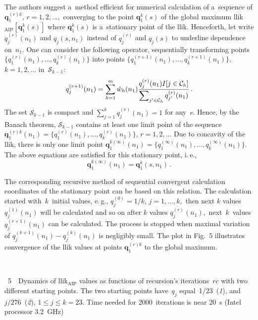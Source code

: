 \begin{multicols}{2}
  


\noindent
The authors suggest a~method efficient  for numerical  calculation of a~sequence
 of $\mathbf{q}_1^{(r)k}$, $r=1, 2, \ldots,$ converging to the point 
 $\mathbf{q}_1^k (s)$ of the global maximum
llik$_{\mathrm{AIP}}[\mathbf{q}_1^k (s)]$
 where $\mathbf{q}_1^k(s)$ is a~stationary point of the llik.
Henceforth, let write $q_j^{(r)}(n_1)$ and $q_j(s, n_1)$ instead of 
$q_j^{(r)}$ and $q_j(s)$ 
to underline  dependence on~$n_1.$
One can consider the following operator, sequentially transforming points
 $\{ q_1^{(r)} (n_1), \ldots, q_k^{(r)}(n_1) \} $ into points 
 $\{ q_1^{(r+1)}(n_1), \ldots, q_k^{(r+1)}(n_1)\} ,$ $k=1, 2,\ldots$
in~$\mathcal{S}_{k-1}$:
$$
q_j^{(r+1)}(n_1) =\sum\limits_{h=1}^m \hat{w}_h (n_1) \displaystyle\frac{\displaystyle q_j^{(r)}(n_1)I[j\in
\mathcal{C}_h]\mathstrut}{\displaystyle \sum\nolimits_{j'\in\mathcal{C}_h} q_{j'}^{(r)}(n_1)\mathstrut}\,.
$$
The set $\mathcal{S}_{k-1}$ is  compact and  
$\sum_{j=1}^k q_j^{(r)}(n_1) =1$ for any~$r$. Hence, by the Banach theorem,
 $\mathcal{S}_{k-1}$ contains at least one limit point of the sequence 
 $\mathbf{q}_1^{(r)k}(n_1) =\{ q_1^{(r)}(n_1), \ldots, q_k^{(r)}(n_1)\}$,
 $r=1, 2, \ldots$ Due to concavity
 of the llik, there  is only one limit point $\mathbf{q}_1^{k(\infty )}(n_1)=
 \{ q_1^{(\infty )}(n_1) , \ldots , q_k^{(\infty )}(n_1) \}$.
 The above equations are satisfied for this stationary point, i.\,e.,
$$
\mathbf{q}_1^{k(\infty )}(n_1) =\mathbf{q}_1^k (s, n_1)\,.
$$

The corresponding recursive method of sequential convergent calculation
   coordinates of the stationary point can be based on this relation. The
   calculation started with~$k$~initial values, e.\,g., $q_j^{(0)} =1/k$,
   $j=1, \ldots, k,$ then next $k$ values $q_j^{(1)}(n_1)$ will be
   calculated and so on after $k$ values $q_j^{(r)}(n_1),$ next~$k$~values 
   $q_j^{(r+1)}(n_1)$ can be calculated. The process is stopped when maximal
   variation of $q_j^{(k+1)}(n_1) - q_j^{(k)}(n_1)$ is negligibly  small.
   The plot in Fig.~5 illustrates convergence of the llik values at
   points  $\mathbf{q}_1^{(r)k}$ to the global maximum.
   
    \begin{center}  %
\vspace*{1pt}
\mbox{%
 \epsfxsize=77.989mm
 }
 
\end{center}


\noindent
{{\figurename~5}\ \ \small{Dynamics of llik$_{\mathrm{AIP}}$ values as functions of  recursion's iterations~$rc$
  with two different starting points. The two starting points have~$q_j$ equal~1/23~(\textit{1}), and $ j/276$~(\textit{2}), $1\le j\le k = 23.$ Time needed for 2000~iterations is near
   20~s (Intel processor 3.2~GHz)}}


\end{multicols}

